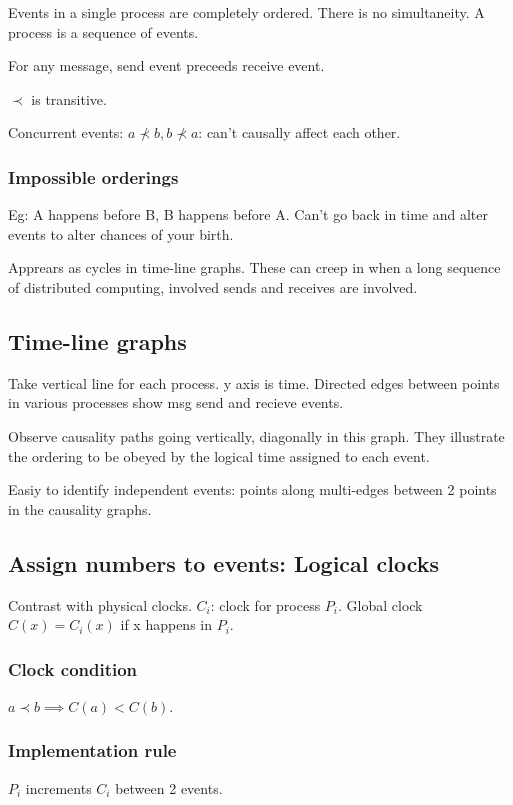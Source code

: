 \documentclass[oneside, article]{memoir}
\begin{document}
Events in a single process are completely ordered. There is no simultaneity. A process is a sequence of events.

For any message, send event preceeds receive event.

$\prec$ is transitive.

Concurrent events: $a \nprec b, b \nprec a$: can't causally affect each other.

\subsubsection{Impossible orderings}
Eg: A happens before B, B happens before A. Can't go back in time and alter events to alter chances of your birth.

Apprears as cycles in time-line graphs. These can creep in when a long sequence of distributed computing, involved sends and receives are involved.

\subsection{Time-line graphs}
Take vertical line for each process. y axis is time. Directed edges between points in various processes show msg send and recieve events.

Observe causality paths going vertically, diagonally in this graph. They illustrate the ordering to be obeyed by the logical time assigned to each event.

Easiy to identify independent events: points along multi-edges between 2 points in the causality graphs.

\subsection{Assign numbers to events: Logical clocks}
Contrast with physical clocks. $C_{i}$: clock for process $P_{i}$. Global clock $C(x) = C_{i}(x)$ if x happens in $P_{i}$.

\subsubsection{Clock condition}
$a \prec b \implies C(a) < C(b)$.

\subsubsection{Implementation rule}
$P_{i}$ increments $C_{i}$ between 2 events.
\end{document}
